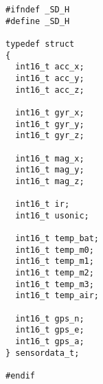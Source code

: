 \documentclass[a4paper,11pt]{article}
\begin{document}
\linespread{0.8}
\begin{lstlisting}
#ifndef _SD_H
#define _SD_H

typedef struct
{
  int16_t acc_x;
  int16_t acc_y;
  int16_t acc_z;
  
  int16_t gyr_x;
  int16_t gyr_y;
  int16_t gyr_z;
  
  int16_t mag_x;
  int16_t mag_y;
  int16_t mag_z;
  
  int16_t ir;
  int16_t usonic;
  
  int16_t temp_bat;
  int16_t temp_m0;
  int16_t temp_m1;
  int16_t temp_m2;
  int16_t temp_m3;
  int16_t temp_air;
  
  int16_t gps_n;
  int16_t gps_e;
  int16_t gps_a;
} sensordata_t;

#endif
\end{lstlisting}
\end{document}

